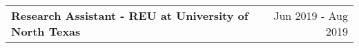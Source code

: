 \begin{tabularx}{\linewidth}{ @{}l r@{} }
\textbf{Research Assistant - REU at University of North Texas}     &   \hspace{30.5mm} Jun 2019 - Aug 2019 \\[3.75pt]
\end{tabularx}